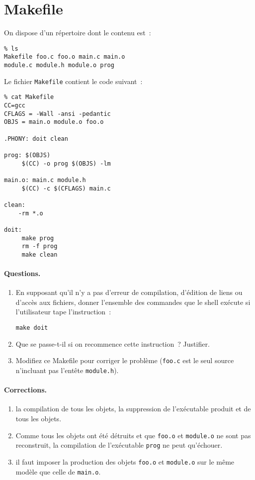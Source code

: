 \section{Makefile}
On dispose d'un r\'epertoire dont le contenu est~:
\begin{verbatim}
% ls 
Makefile foo.c foo.o main.c main.o 
module.c module.h module.o prog
\end{verbatim}
Le fichier \verb+Makefile+ contient le code suivant~:
\begin{verbatim}
% cat Makefile 
CC=gcc 
CFLAGS = -Wall -ansi -pedantic
OBJS = main.o module.o foo.o

.PHONY: doit clean

prog: $(OBJS)
     $(CC) -o prog $(OBJS) -lm

main.o: main.c module.h
     $(CC) -c $(CFLAGS) main.c

clean:
    -rm *.o

doit:
     make prog 
     rm -f prog 
     make clean
\end{verbatim}
\paragraph{Questions.}
\begin{enumerate}
\item En supposant qu'il n'y a pas d'erreur de compilation, d'\'edition de
liens ou d'acc\`es aux fichiers, donner l'ensemble des commandes que le
shell ex\'ecute si l'utilisateur tape l'instruction~:
\begin{verbatim}
make doit
\end{verbatim}
\item Que se passe-t-il si on recommence cette instruction~? Justifier.
\item Modifiez ce Makefile pour corriger le probl\`eme (\verb+foo.c+ est le seul source n'incluant pas l'ent\^ete \verb?module.h?).
\end{enumerate}

\ifcorrection
\paragraph{Corrections.}
\begin{enumerate}
\item la compilation de tous les objets, la suppression de
  l'ex\'ecutable produit et de tous les objets.
\item Comme tous les objets ont \'et\'e d\'etruits et que \verb+foo.o+
  et \verb+module.o+ ne sont pas reconstruit, la compilation de
  l'ex\'ecutable \verb+prog+ ne peut qu'\'echouer.
\item il faut imposer la production des objets  \verb+foo.o+
  et \verb+module.o+ sur le m\^eme mod\`ele que celle de \verb|main.o|.
\end{enumerate}
\fi
